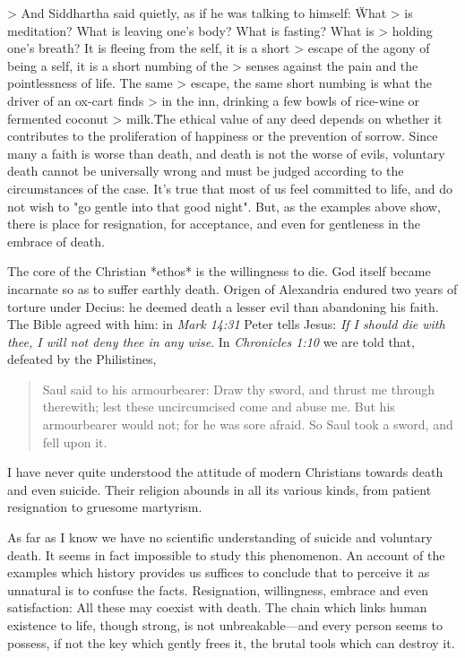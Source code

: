 \documentclass[a4paper, 12pt]{article}
\begin{document}
> And Siddhartha said quietly, as if he was talking to himself: \"What
> is meditation? What is leaving one's body? What is fasting? What is
> holding one's breath? It is fleeing from the self, it is a short
> escape of the agony of being a self, it is a short numbing of the
> senses against the pain and the pointlessness of life. The same
> escape, the same short numbing is what the driver of an ox-cart finds
> in the inn, drinking a few bowls of rice-wine or fermented coconut
> milk.\"


The ethical value of any deed depends on whether it contributes to the
proliferation of happiness or the prevention of sorrow. Since many a faith is
worse than death, and death is not the worse of evils, voluntary death cannot
be universally wrong and must be judged according to the circumstances of the
case. It's true that most of us feel committed to life, and do not wish to "go
gentle into that good night". But, as the examples above show, there is place
for resignation, for acceptance, and even for gentleness in the embrace of
death.


The core of the Christian *ethos* is the willingness to die. God itself became
incarnate so as to suffer earthly death. Origen of Alexandria endured two years
of torture under Decius: he deemed death a lesser evil than abandoning his
faith. The Bible agreed with him: in \textit{Mark 14:31} Peter tells Jesus:
\textit{ If I should die with thee, I will not deny thee in any wise}. In
\textit{Chronicles 1:10} we are told that, defeated by the Philistines, 

\begin{quote}
    Saul said to his armourbearer: Draw thy sword, and thrust me through
    therewith; lest these uncircumcised come and abuse me. But his armourbearer
    would not; for he was sore afraid. So Saul took a sword, and fell upon it.
\end{quote}

I have never quite understood the attitude of modern Christians towards death
and even suicide. Their religion abounds in all its various kinds, from patient
resignation to gruesome martyrism. 

As far as I know we have no scientific understanding of suicide and voluntary
death. It seems in fact impossible to study this phenomenon. An account of the
examples which history provides us suffices to conclude that to perceive it as
unnatural is to confuse the facts. Resignation, willingness, embrace and even
satisfaction: All these may coexist with death. The chain which links human
existence to life, though strong, is not unbreakable---and every person seems
to possess, if not the key which gently frees it, the brutal tools which can
destroy it.
\end{document}
